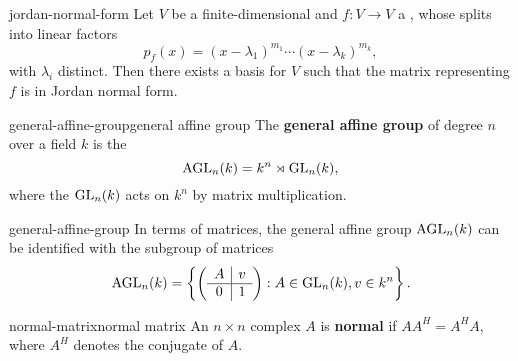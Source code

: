 \begin{example}{jordan-normal-form}
    Let $V$ be a finite-dimensional  and $f \colon V \to V$ a , whose  splits into linear factors
    \[ p_f(x) = (x - \lambda_1)^{m_1} \cdots (x - \lambda_k)^{m_k} , \]
    with $\lambda_i$ distinct. Then there exists a basis for $V$ such that the matrix representing $f$ is in Jordan normal form.
\end{example}

\begin{topic}{general-affine-group}{general affine group}
    The \textbf{general affine group} of degree $n$ over a field $k$ is the 
    \[ \textup{AGL}_n(k) = k^n \rtimes \textup{GL}_n(k) , \]
    where the  $\textup{GL}_n(k)$ acts on $k^n$ by matrix multiplication.
\end{topic}

\begin{example}{general-affine-group}
    In terms of matrices, the general affine group $\textup{AGL}_n(k)$ can be identified with the subgroup of matrices
    \[ \textup{AGL}_n(k) = \left\{ \left(\begin{array}{c|c} A & v \\ \hline 0 & 1 \end{array}\right) : A \in \textup{GL}_n(k), v \in k^n \right\} . \]
\end{example}

\begin{topic}{normal-matrix}{normal matrix}
    An $n \times n$ complex  $A$ is \textbf{normal} if $A A^H = A^H A$, where $A^H$ denotes the conjugate  of $A$.
\end{topic}
